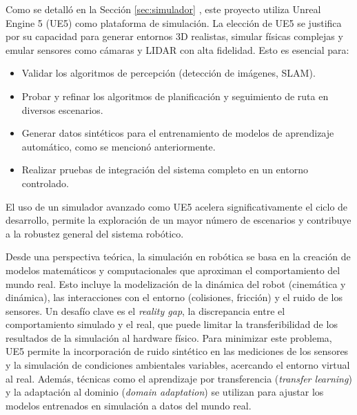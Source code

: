 Como se detalló en la Sección \ref{sec:simulador} , este proyecto utiliza Unreal Engine 5 (UE5) como plataforma de simulación. La elección de UE5 se justifica por su capacidad para generar entornos 3D realistas, simular físicas complejas y emular sensores como cámaras y LIDAR con alta fidelidad. Esto es esencial para:
\begin{itemize}
    \item Validar los algoritmos de percepción (detección de imágenes, SLAM).
    \item Probar y refinar los algoritmos de planificación y seguimiento de ruta en diversos escenarios.
    \item Generar datos sintéticos para el entrenamiento de modelos de aprendizaje automático, como se mencionó anteriormente.
    \item Realizar pruebas de integración del sistema completo en un entorno controlado.
\end{itemize}
El uso de un simulador avanzado como UE5 acelera significativamente el ciclo de desarrollo, permite la exploración de un mayor número de escenarios y contribuye a la robustez general del sistema robótico.

Desde una perspectiva teórica, la simulación en robótica se basa en la creación de modelos matemáticos y computacionales que aproximan el comportamiento del mundo real. Esto incluye la modelización de la dinámica del robot (cinemática y dinámica), las interacciones con el entorno (colisiones, fricción) y el ruido de los sensores. Un desafío clave es el \textit{reality gap}, la discrepancia entre el comportamiento simulado y el real, que puede limitar la transferibilidad de los resultados de la simulación al hardware físico. Para minimizar este problema, UE5 permite la incorporación de ruido sintético en las mediciones de los sensores y la simulación de condiciones ambientales variables, acercando el entorno virtual al real. Además, técnicas como el aprendizaje por transferencia (\textit{transfer learning}) y la adaptación al dominio (\textit{domain adaptation}) se utilizan para ajustar los modelos entrenados en simulación a datos del mundo real.